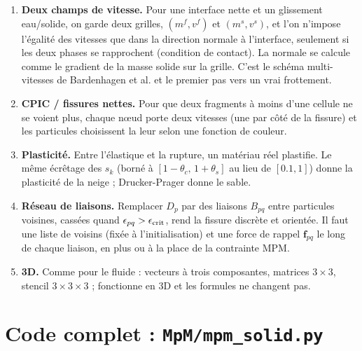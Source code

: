 \documentclass[11pt,a4paper]{article}
\newcommand{\code}[1]{\texttt{\detokenize{#1}}}
\begin{document}
\begin{enumerate}
  \item \textbf{Deux champs de vitesse.} Pour une interface nette et un glissement eau/solide, on
        garde deux grilles, $(m^f, v^f)$ et $(m^s, v^s)$, et l'on n'impose l'égalité des vitesses
        que dans la direction normale à l'interface, seulement si les deux phases se rapprochent
        (condition de contact). La normale se calcule comme le gradient de la masse solide sur la
        grille. C'est le schéma \og multi-vitesses \fg{} de Bardenhagen et al. et le premier pas vers
        un vrai frottement.
  \item \textbf{CPIC / fissures nettes.} Pour que deux fragments à moins d'une cellule ne se
        \og voient \fg{} plus, chaque n\oe ud porte deux vitesses (une par côté de la fissure) et les
        particules choisissent la leur selon une fonction de couleur.
  \item \textbf{Plasticité.} Entre l'élastique et la rupture, un matériau réel plastifie. Le même
        écrêtage des $s_k$ (borné à $[1-\theta_c,\,1+\theta_s]$ au lieu de $[0.1, 1]$) donne la
        plasticité de la neige ; Drucker-Prager donne le sable.
  \item \textbf{Réseau de liaisons.} Remplacer $D_p$ par des liaisons $B_{pq}$ entre particules
        voisines, cassées quand $\epsilon_{pq} > \epsilon_{\rm crit}$, rend la fissure discrète et
        orientée. Il faut une liste de voisins (fixée à l'initialisation) et une force de rappel
        $\mathbf f_{pq}$ le long de chaque liaison, en plus ou à la place de la contrainte MPM.
  \item \textbf{3D.} Comme pour le fluide : vecteurs à trois composantes, matrices $3\times3$,
        stencil $3\times3\times3$ ; \code{ti.svd} fonctionne en 3D et les formules ne changent pas.
\end{enumerate}

\appendix
\section{Code complet : \texttt{MpM/mpm\_solid.py}}
\label{app:solid}
\end{document}
